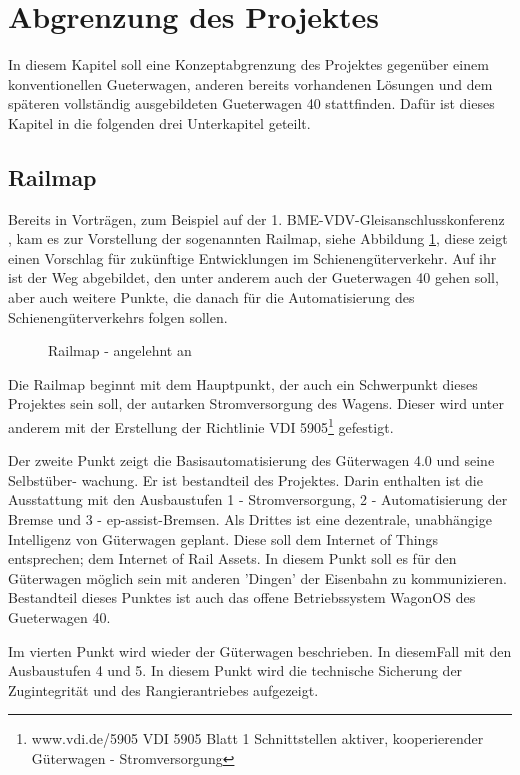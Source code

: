 \section{Abgrenzung des Projektes}\label{sec:Abgrenzung}
In diesem Kapitel soll eine Konzeptabgrenzung des Projektes gegenüber einem konventionellen \gls{Gueterwagen}, anderen bereits vorhandenen Lösungen und dem späteren vollständig ausgebildeten \gls{Gueterwagen 40} stattfinden. Dafür ist dieses Kapitel in die folgenden drei Unterkapitel geteilt.

\subsection{Railmap}
Bereits in Vorträgen, zum Beispiel auf der 1. BME-VDV-Gleisanschlusskonferenz \cite{GAK}, kam es zur Vorstellung der sogenannten Railmap, siehe Abbildung \ref{fig:Railmap}, diese zeigt einen Vorschlag für zukünftige Entwicklungen im Schienengüterverkehr. Auf ihr ist der Weg abgebildet, den unter anderem auch der \gls{Gueterwagen 40}  gehen soll, aber auch weitere Punkte, die danach für die Automatisierung des Schienengüterverkehrs folgen sollen.\par
\begin{figure}[hbp]
    \centering
    
    \caption{Railmap - angelehnt an \cite{GAK}}
    \label{fig:Railmap}
\end{figure}
Die Railmap beginnt mit dem Hauptpunkt, der auch ein Schwerpunkt dieses Projektes sein soll, der autarken Stromversorgung des Wagens. Dieser wird unter anderem mit der Erstellung der Richtlinie VDI 5905\footnote{www.vdi.de/5905 VDI 5905 Blatt 1 Schnittstellen aktiver, kooperierender Güterwagen - Stromversorgung} gefestigt.\par
Der zweite Punkt zeigt die Basisautomatisierung des Güterwagen 4.0 und seine Selbstüber- wachung. Er ist bestandteil des Projektes. Darin enthalten ist die Ausstattung mit den Ausbaustufen 1 - Stromversorgung, 2 - Automatisierung der Bremse und 3 - \gls{ep-assist-Bremsen}.
Als Drittes ist eine dezentrale, unabhängige Intelligenz von Güterwagen geplant. Diese soll dem Internet of Things entsprechen; dem Internet of Rail Assets. In diesem Punkt soll es für den Güterwagen möglich sein mit anderen 'Dingen' der Eisenbahn zu kommunizieren. Bestandteil dieses Punktes  ist auch das offene Betriebssystem \gls{WagonOS} des \gls{Gueterwagen 40}.\par
Im vierten Punkt wird wieder der Güterwagen beschrieben. In diesemFall mit den Ausbaustufen 4 und 5. In diesem Punkt wird die technische Sicherung der Zugintegrität und des Rangierantriebes aufgezeigt.\par
